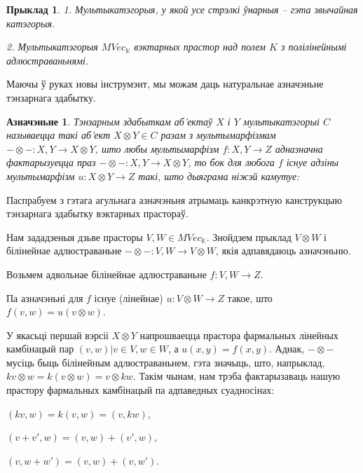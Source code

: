 \documentclass[a4paper,12pt]{book}
\newtheorem{example}{Прыклад}[section]
\newtheorem{definition}{Азначэньне}[section]
\begin{document}
\begin{example}
  1. Мультыкатэгорыя, у якой усе стрэлкі ўнарныя -- гэта звычайная
  катэгорыя.

  2. Мультыкатэгорыя $MVec_{\mathbb{K}}$ вэктарных прастор над полем
  $K$ з полілінейнымі адлюстраваньнямі.
\end{example}

Маючы ў руках новы інструмэнт, мы можам даць натуральнае азначэньне
тэнзарнага здабытку.

\begin{definition}
  Тэнзарным здабыткам аб'ектаў $X$ і $Y$ мультыкатэгорыі $C$
  называецца такі аб'ект $X \otimes Y \in C$ разам з мультымарфізмам
  $- \otimes -: X, Y \rightarrow X \otimes Y$, што любы мультымарфізм
  $f: X, Y \rightarrow Z$ адназначна фактарызуецца праз $- \otimes -:
  X, Y \rightarrow X \otimes Y$, то бок для любога $f$ існуе адзіны
  мультымарфізм $u: X \otimes Y \rightarrow Z$ такі, што дыяграма
  ніжэй камутуе:

\end{definition}

Паспрабуем з гэтага агульнага азначэньня атрымаць канкрэтную
канструкцыю тэнзарнага здабытку вэктарных прастораў.

Нам зададзеныя дзьве прасторы $V, W \in MVec_{\mathbb{K}}$.
Знойдзем прыклад $V \otimes W$ і білінейнае адлюстраваньне $-\otimes-: V, W
\rightarrow V \otimes W$, якія адпавядаюць азначэньню.

Возьмем адвольнае білінейнае адлюстраваньне $f: V, W \rightarrow
Z$.

Па азначэньні для $f$ існуе (лінейнае) $u: V \otimes W \rightarrow Z$ такое, што
$f(v, w) = u(v \otimes w)$.

У якасьці першай вэрсіі $X \otimes Y$ напрошваецца прастора фармальных
лінейных камбінацый пар $(v, w) | v \in V, w \in W$, а $u(x, y) = f(x,
y)$.
Аднак, $- \otimes -$ мусіць быць білінейным адлюстраваньнем, гэта
значыць, што, напрыклад, $kv \otimes w = k(v \otimes w) = v \otimes
kw$. Такім чынам, нам трэба фактарызаваць нашую прастору фармальных
камбінацый па адпаведных суадносінах:

$(kv, w) = k(v, w) = (v, kw)$,

$(v + v', w) = (v, w) + (v', w)$,

$(v, w + w') = (v, w) + (v, w')$.
\end{document}
